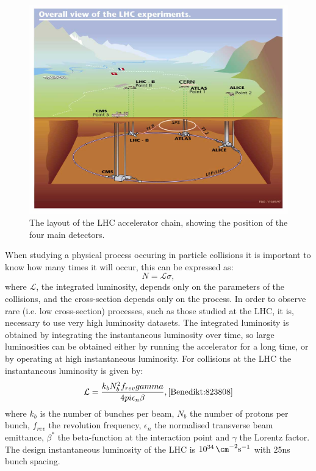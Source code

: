 \begin{figure}
  \includegraphics[width=\largefigwidth]{plots/detector/lhc_layout_sch.jpg}
  \caption{The layout of the LHC accelerator chain, showing the position of the four main detectors.}
  \label{fig:lhclayout}
\end{figure}

When studying a physical process occuring in particle collisions it is important to know how many times it will occur, this can be expressed as:
\begin{equation}
  N = \mathcal{L}\sigma,
\end{equation}
where $\mathcal{L}$, the integrated luminosity, depends only on the parameters of the collisions, and the cross-section depends only on the process. In order to observe rare (i.e. low cross-section) processes, such as those studied at the LHC, it is, necessary to use very high luminosity datasets. The integrated luminosity is obtained by integrating the instantaneous luminosity over time, so large luminosities can be obtained either by running the accelerator for a long time, or by operating at high instantaneous luminosity. For collisions at the LHC the instantaneous luminosity is given by:
\begin{equation}
  \mathcal{L}=\frac{k_{b}N_{b}^{2}f_{rev}\gamma}{4\pi\epsilon_{n}\beta}, \cite{Benedikt:823808}
\end{equation}
where $k_{b}$ is the number of bunches per beam, $N_{b}$ the number of protons per bunch, $f_{rev}$ the revolution frequency, $\epsilon_{n}$ the normalised transverse beam emittance, $\beta^{*}$ the beta-function at the interaction point and $\gamma$ the Lorentz factor. The design instantaneous luminosity of the LHC is $10^{34}\,\cm^{-2}\rm{s}^{-1}$ with 25ns bunch spacing.

